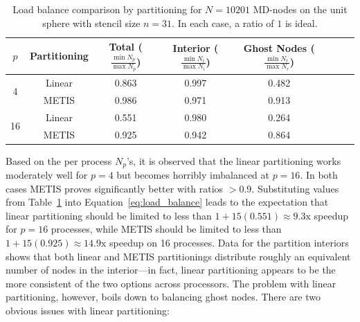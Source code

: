 \documentclass{report}
\begin{document}
\begin{table}
\centering
\caption{Load balance comparison by partitioning for $N=10201$ MD-nodes on the unit sphere with stencil size $n=31$. In each case, a ratio of $1$ is ideal.}
\label{tbl:load_balance}
\begin{tabular}{c|c|c|c|c|c|c|c}
$p$ & Partitioning & Total ($\frac{\min N_p}{\max N_p}$) &  Interior ($\frac{\min N_i}{\max N_i}$) & Ghost Nodes ($\frac{\min N_r}{\max N_r}$)  \\ \hline
\multirow{2}{*}{4} & Linear  &  0.863 & 0.997 & 0.482  \\
& METIS  & 0.986 & 0.971 & 0.913   \\ \hline
\multirow{2}{*}{16} & Linear &  0.551 & 0.980 & 0.264   \\
& METIS & 0.925 & 0.942 & 0.864  \\
\end{tabular}
\end{table}
%
Based on the per process $N_p$'s, it is observed that the linear partitioning works moderately well for $p=4$ but becomes horribly imbalanced at $p=16$. In both cases METIS proves significantly better with ratios $> 0.9$. Substituting values from Table~\ref{tbl:load_balance} into Equation~\ref{eq:load_balance} leads to the expectation that linear partitioning should be limited to less than $1+15 (0.551) \approx 9.3\text{x}$ speedup for $p=16$ processes, while METIS should be limited to less than $1+15 (0.925) \approx  14.9\text{x}$ speedup on 16 processes. Data for the partition interiors shows that both linear and METIS partitionings distribute roughly an equivalent number of nodes in the interior---in fact, linear partitioning appears to be the more consistent of the two options across processors. The problem with linear partitioning, however, boils down to balancing ghost nodes. There are two obvious issues with linear partitioning:
\end{document}
